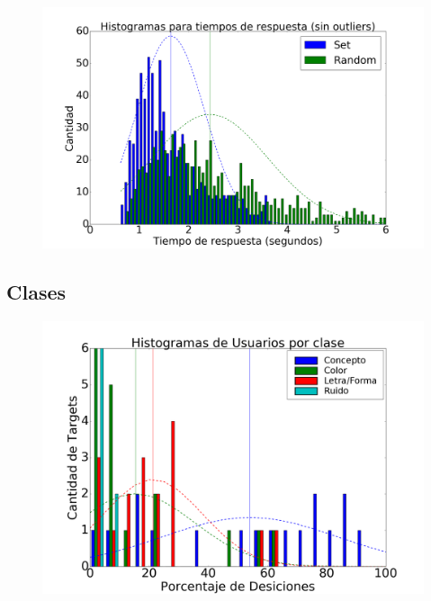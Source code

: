 \documentclass{beamer}
\begin{document}
\begin{frame}
\begin{figure}[c]
 \centering
  \begin{minipage}[c]{1\textwidth}
	\centering	
	\includegraphics[scale=0.22]{rt_hist.png}
  \end{minipage}
\end{figure}
\end{frame}

\subsection{Clases}

\begin{frame}
\begin{figure}[c]
 \centering
  \begin{minipage}[c]{1\textwidth}
	\centering	
	\includegraphics[scale=0.27]{hist_users.png}
  \end{minipage}
\end{figure}
\end{frame}
\end{document}
